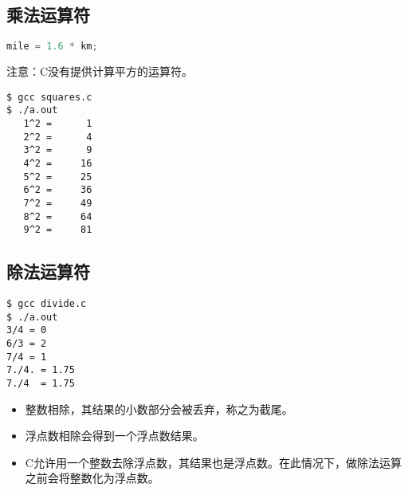 \subsection{乘法运算符}
\begin{frame}[fragile]\ft{\subsecname}
\begin{lstlisting}[language=c,backgroundcolor=\color{red!10}]
  mile = 1.6 * km;
\end{lstlisting}
\vspace{1em}

\textcolor{acolor3}{注意：C没有提供计算平方的运算符。}
\end{frame}


\begin{frame}[fragile]\ft{\subsecname}


\end{frame}


\begin{frame}[fragile]\ft{\subsecname}
\begin{lstlisting}[backgroundcolor=\color{red!10}]
$ gcc squares.c
$ ./a.out 
   1^2 =      1
   2^2 =      4
   3^2 =      9
   4^2 =     16
   5^2 =     25
   6^2 =     36
   7^2 =     49
   8^2 =     64
   9^2 =     81
\end{lstlisting}
\end{frame}



\subsection{除法运算符}
\begin{frame}[fragile]\ft{\subsecname}
      
\end{frame}
\begin{frame}[fragile]\ft{\subsecname}
\begin{lstlisting}[backgroundcolor=\color{red!10}]
$ gcc divide.c
$ ./a.out  
3/4 = 0
6/3 = 2
7/4 = 1
7./4. = 1.75
7./4  = 1.75
\end{lstlisting}    
\end{frame}




\begin{frame}[fragile]\ft{\subsecname}
\begin{itemize}
\item 整数相除，其结果的小数部分会被丢弃，称之为截尾。\\[0.1in]
\item 浮点数相除会得到一个浮点数结果。\\[0.1in]
\item C允许用一个整数去除浮点数，其结果也是浮点数。在此情况下，做除法运算之前会将整数化为浮点数。
\end{itemize}
\end{frame}

